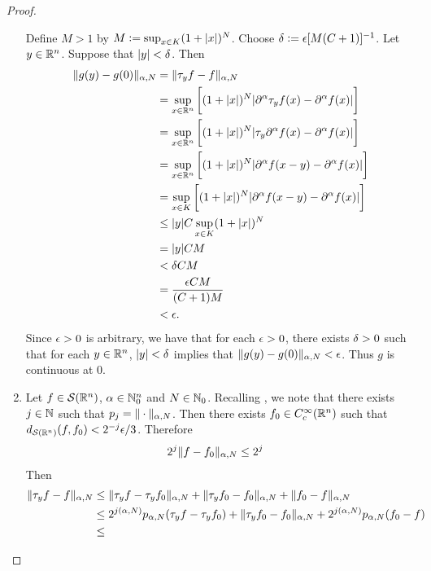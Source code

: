 \documentclass{book}
\begin{document}
\begin{proof}
\begin{enumerate}
			Define $M > 1$ by $M \vcentcolon= \sup_{x \in K} (1+|x|)^N$. Choose $\delta \vcentcolon= \epsilon [M (C+1)]^{-1}$. Let $y \in \mathbb{R}^n$. Suppose that $|y| < \delta$. Then 
			\begin{align*}
				\| g(y) - g(0) \|_{\alpha, N}
				& = \| \tau_yf - f \|_{\alpha, N} \\
				& = \sup_{x \in \mathbb{R}^n} \bigg[ (1+|x|)^N |\partial^{\alpha} \tau_y f(x) - \partial^{\alpha}f(x)| \bigg] \\
				& = \sup_{x \in \mathbb{R}^n} \bigg[ (1+|x|)^N |\tau_y \partial^{\alpha} f(x) - \partial^{\alpha}f(x)| \bigg] \\
				& = \sup_{x \in \mathbb{R}^n} \bigg[ (1+|x|)^N | \partial^{\alpha} f(x - y) - \partial^{\alpha}f(x)| \bigg] \\
				& = \sup_{x \in K} \bigg[ (1+|x|)^N | \partial^{\alpha} f(x - y) - \partial^{\alpha}f(x)| \bigg] \\
				& \leq  |y| C \sup_{x \in K} (1+|x|)^N \\
				& =  |y| C M \\
				& < \delta C  M \\
				& = \frac{\epsilon C M}{(C+1)M} \\
				& < \epsilon. 
			\end{align*}
			Since $\epsilon >0$ is arbitrary, we have that for each $\epsilon > 0$, there exists $\delta > 0$ such that for each $y \in \mathbb{R}^n$, $|y| < \delta$ implies that $\|g(y) - g(0)\|_{\alpha, N} < \epsilon$. Thus $g$ is continuous at $0$. 
			\item Let $f \in \mathcal{S}(\mathbb{R}^n)$, $\alpha \in \mathbb{N}_0^n$ and $N \in \mathbb{N}_0$. Recalling , we note that there exists $j \in \mathbb{N}$ such that $p_j = \| \cdot \|_{\alpha, N}$. Then there exists $f_0 \in C^{\infty}_c(\mathbb{R}^n)$ such that $d_{\mathcal{S}(\mathbb{R}^n)}(f, f_0) < 2^{-j}\epsilon/3$. Therefore
			\begin{align*}
				2^j \| f - f_0\|_{\alpha, N}
				& \leq 2^j
			\end{align*}
			 Then 
			\begin{align*}
				\|\tau_y f - f\|_{\alpha, N}
				& \leq \|\tau_y f - \tau_y f_0\|_{\alpha, N} + \|\tau_y f_0 - f_0 \|_{\alpha, N} + \|f_0 - f\|_{\alpha, N} \\
				& \leq 2^{j(\alpha, N)} p_{\alpha, N}( \tau_y f - \tau_y f_0) + \|\tau_y f_0 - f_0\|_{\alpha, N} + 2^{j(\alpha, N)} p_{\alpha, N}( f_0 - f) \\
				& \leq 
			\end{align*}
		\end{enumerate}
	\end{proof}
\end{document}
